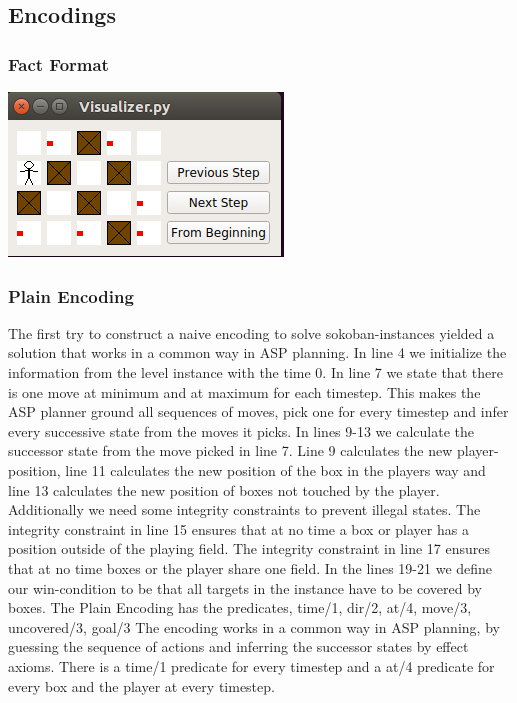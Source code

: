 \documentclass{article}
\begin{document}
\subsection{Encodings}
\subsubsection{Fact Format}
\includegraphics{Visualizer}

\subsubsection{Plain Encoding}

The first try to construct a naive encoding to solve sokoban-instances yielded a solution that works in a common way in ASP planning. In line 4 we initialize the information from the level instance with the time 0. In line 7 we state that there is one move at minimum and at maximum for each timestep. This makes the ASP planner ground all sequences of moves, pick one for every timestep and infer every successive state from the moves it picks. In lines 9-13 we calculate the successor state from the move picked in line 7. Line 9 calculates the new player-position, line 11 calculates the new position of the box in the players way and line 13 calculates the new position of boxes not touched by the player. Additionally we need some integrity constraints to prevent illegal states. The integrity constraint in line 15 ensures that at no time a box or player has a position outside of the playing field. The integrity constraint in line 17 ensures that at no time boxes or the player share one field.
In the lines 19-21 we define our win-condition to be that all targets in the instance have to be covered by boxes.
The Plain Encoding has the predicates, time/1, dir/2, at/4, move/3, uncovered/3, goal/3
The encoding works in a common way in ASP planning, by guessing the sequence of actions and inferring the successor states by effect axioms. There is a time/1 predicate for every timestep and a at/4 predicate for every box and the player at every timestep.
\end{document}
